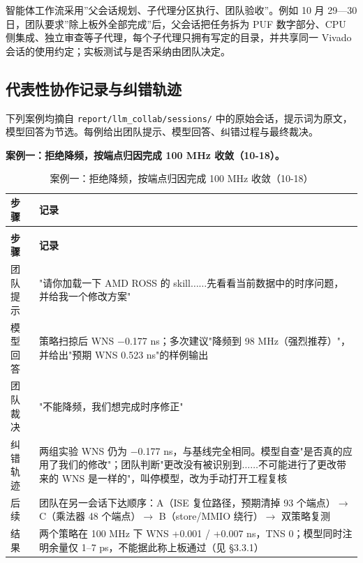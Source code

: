智能体工作流采用''父会话规划、子代理分区执行、团队验收''。例如 10 月 29---30 日，团队要求''除上板外全部完成''后，父会话把任务拆为 PUF 数字部分、CPU 侧集成、独立审查等子代理，每个子代理只拥有写定的目录，并共享同一 Vivado 会话的使用约定；实板测试与是否采纳由团队决定。

\Needspace{85pt}

\subsection{代表性协作记录与纠错轨迹}

下列案例均摘自 \texttt{report/\allowbreak{}llm\_\allowbreak{}collab/\allowbreak{}sessions/\allowbreak{}} 中的原始会话，提示词为原文，模型回答为节选。每例给出团队提示、模型回答、纠错过程与最终裁决。

\textbf{案例一：拒绝降频，按端点归因完成 100 MHz 收敛（10-18）。}

{\small
\setlength{\tabcolsep}{4pt}
\renewcommand{\thetable}{2-21}
\begin{longtable}{@{}>{\raggedright\arraybackslash}p{}>{\raggedright\arraybackslash}p{}@{}}
\caption{案例一：拒绝降频，按端点归因完成 100 MHz 收敛（10-18）}\label{tab:2-21}\\
\toprule
\textbf{步骤} & \textbf{记录} \\
\midrule
\endfirsthead
\multicolumn{2}{@{}l}{\footnotesize 续表 2-21}\\
\toprule
\textbf{步骤} & \textbf{记录} \\
\midrule
\endhead
团队提示 & "请你加载一下 AMD ROSS 的 skill$\ldots$$\ldots$先看看当前数据中的时序问题，并给我一个修改方案" \\
模型回答 & 策略扫掠后 WNS $-$0.177 ns；多次建议"降频到 98 MHz（强烈推荐）"，并给出"预期 WNS 0.523 ns"的样例输出 \\
团队裁决 & "不能降频，我们想完成时序修正" \\
纠错轨迹 & 两组实验 WNS 仍为 $-$0.177 ns，与基线完全相同。模型自查"是否真的应用了我们的修改"；团队判断"更改没有被识别到$\ldots$$\ldots$不可能进行了更改带来的 WNS 是一样的"，叫停模型，改为手动打开工程复核 \\
后续 & 团队在另一会话下达顺序：A（ISE 复位路径，预期清掉 93 个端点）$\rightarrow$ C（乘法器 48 个端点）$\rightarrow$ B（store/MMIO 绕行）$\rightarrow$ 双策略复测 \\
结果 & 两个策略在 100 MHz 下 WNS +0.001 / +0.007 ns，TNS 0；模型同时注明余量仅 1--7 ps，不能据此称上板通过（见 §3.3.1） \\
\bottomrule
\end{longtable}
}

